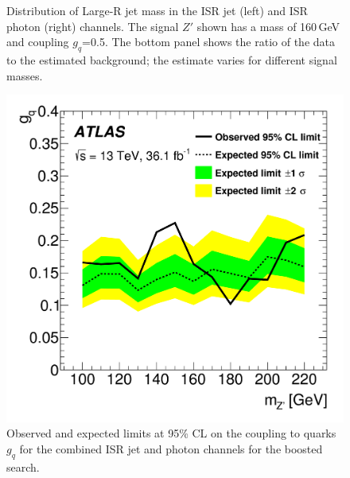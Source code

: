 \begin{figure}[ht!]
	\centering
	\hspace{0.1\textwidth}%
	\caption{Distribution of Large-R jet mass in the ISR jet (left) and ISR photon (right) channels.  The signal $Z'$ shown has a mass of 160\,GeV and coupling $g_q$=0.5.  The bottom panel shows the ratio of the data to the estimated background; the estimate varies for different signal masses.}
	\label{fig:ISRSearch}
\end{figure}

\begin{figure}[ht!]
	\centering
	\includegraphics[width=0.6\columnwidth]{figures/Conclusion/ISR_Limits.png}
	\caption{Observed and expected limits at 95\% CL on the coupling to quarks $g_q$ for the combined ISR jet and photon channels for the boosted search. }
	\label{fig:ISRLimits}
\end{figure}

